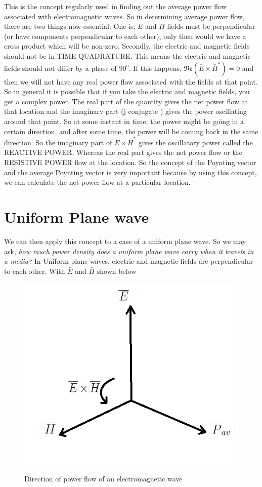 This is the concept regularly used in finding out the average power flow associated with electromagnetic waves. So in determining average power flow, there are two things now essential. One is, $ \bar{E} $ and $ \bar{H} $ fields must be perpendicular (or have components perpendicular to each other), only then would we have a cross product which will be non-zero. Secondly, the electric and magnetic fields should not be in TIME QUADRATURE. This means the electric and magnetic fields should not differ by a phase of $90^{o}$. If this happens, $ \mathfrak{Re}(\bar{E}\times\bar{H}^{*})=0 $ and then we will not have any real power flow associated with the fields at that point. So in general it is possible that if you take the electric and magnetic fields, you get a complex power. The real part of the quantity gives the net power flow at that location and the imaginary part (j conjugate ) gives the power oscillating around that point. So at some instant in time, the power might be going in a certain direction, and after some time, the power will be coming back in the same direction. So the imaginary part of $ E\times\bar{H}^{*} $ gives the oscillatory power called the REACTIVE POWER. Whereas the real part gives the net power flow or the RESISTIVE POWER flow at the location. So the concept of the Poynting vector and the average Poynting vector is very important because by using this concept, we can calculate the net power flow at a particular location.

\section{Uniform Plane wave}
We can then apply this concept to a case of a uniform plane wave. So we may ask, \emph{how much power density does a uniform plane wave carry when it travels in a media?} In Uniform plane waves, electric and magnetic fields are perpendicular to each other. With $ \bar{E} $ and $ \bar{H} $ shown below
\begin{figure}[h]
\centering
\textsc{\includegraphics[width=.7\linewidth]{./graphics/cc}}
\caption{Direction of power flow of an electromagnetic wave}
\end{figure}

